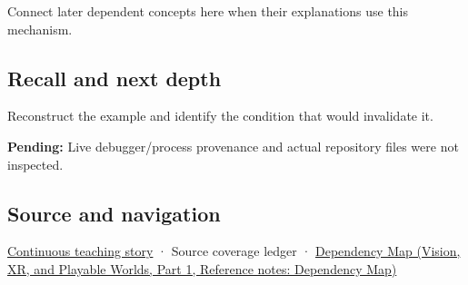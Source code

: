 \hypertarget{appendix-230b59c0676b-used-by}{}

Connect later dependent concepts here when their explanations use this mechanism.

\subsection{Recall and next depth}\label{appendix-230b59c0676b-recall-and-next-depth}

\hypertarget{appendix-230b59c0676b-recall-and-next-depth}{}

Reconstruct the example and identify the condition that would invalidate it.

\textbf{Pending:} Live debugger/process provenance and actual repository files were not inspected.

\subsection{Source and navigation}\label{appendix-230b59c0676b-source-and-navigation}

\hypertarget{appendix-230b59c0676b-source-and-navigation}{}

\hyperref[01-foundations-i-ch002-bytes-become-a-durable-agreement]{Continuous teaching story} · {Source coverage ledger} · \href{../07-Vision-XR-and-Playable-Worlds-P01/main.pdf\#appendix-4ad47bdd269a}{Dependency Map (Vision, XR, and Playable Worlds, Part 1, Reference notes: Dependency Map)}
